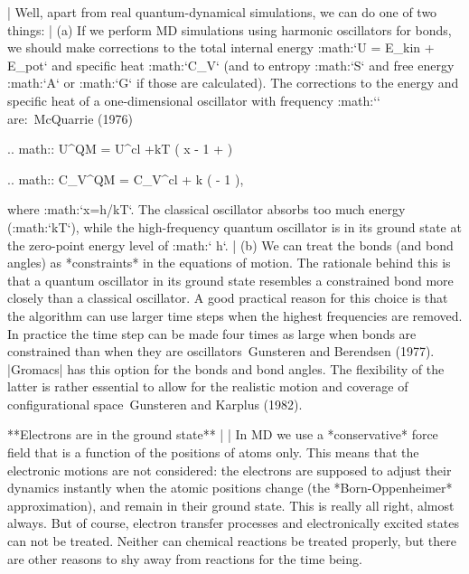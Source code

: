     | Well, apart from real quantum-dynamical simulations, we can do one
      of two things:
    | (a) If we perform MD simulations using harmonic oscillators for
      bonds, we should make corrections to the total internal energy
      :math:`U = E_{kin} + E_{pot}` and specific heat :math:`C_V` (and
      to entropy :math:`S` and free energy :math:`A` or :math:`G` if
      those are calculated). The corrections to the energy and specific
      heat of a one-dimensional oscillator with frequency :math:`\nu`
      are: McQuarrie (1976)

      .. math:: U^{QM} = U^{cl} +kT \left( {}x - 1 +  \right)

      .. math:: C_V^{QM} = C_V^{cl} + k \left(  - 1 \right),

       where :math:`x=h\nu /kT`. The classical oscillator absorbs too
      much energy (:math:`kT`), while the high-frequency quantum
      oscillator is in its ground state at the zero-point energy level
      of :math:` h\nu`.
    | (b) We can treat the bonds (and bond angles) as *constraints* in
      the equations of motion. The rationale behind this is that a
      quantum oscillator in its ground state resembles a constrained
      bond more closely than a classical oscillator. A good practical
      reason for this choice is that the algorithm can use larger time
      steps when the highest frequencies are removed. In practice the
      time step can be made four times as large when bonds are
      constrained than when they are oscillators Gunsteren and Berendsen
      (1977). |Gromacs| has this option for the bonds and bond angles. The
      flexibility of the latter is rather essential to allow for the
      realistic motion and coverage of configurational space Gunsteren
      and Karplus (1982).

**Electrons are in the ground state**
    | 
    | In MD we use a *conservative* force field that is a function of
      the positions of atoms only. This means that the electronic
      motions are not considered: the electrons are supposed to adjust
      their dynamics instantly when the atomic positions change (the
      *Born-Oppenheimer* approximation), and remain in their ground
      state. This is really all right, almost always. But of course,
      electron transfer processes and electronically excited states can
      not be treated. Neither can chemical reactions be treated
      properly, but there are other reasons to shy away from reactions
      for the time being.

